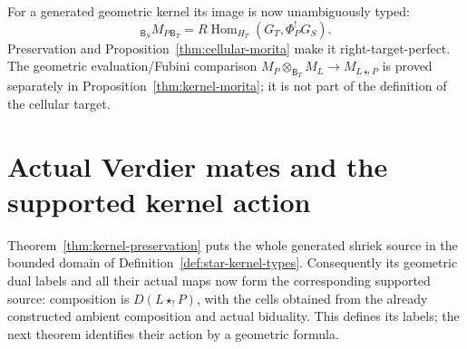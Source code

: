 \documentclass[11pt]{article}
\theoremstyle{definition}
\theoremstyle{remark}
\newcommand{\RHom}{R\operatorname{Hom}}
\begin{document}
For a generated geometric kernel its image is now unambiguously typed:
\[
 {}_{\mathsf B_S}M_P{}_{\mathsf B_T}
 =\RHom_{H_T}(G_T,\Phi_P^!G_S).
\]
Preservation and Proposition~\ref{thm:cellular-morita} make it
right-target-perfect.  The geometric evaluation/Fubini comparison
$M_P\otimes_{\mathsf B_T}M_L\to M_{L\star_!P}$ is proved separately
in Proposition~\ref{thm:kernel-morita}; it is not part of the definition
of the cellular target.

\section{Actual Verdier mates and the supported kernel action}
\label{sec:verdier-mates}
Theorem~\ref{thm:kernel-preservation} puts the whole generated shriek
source in the bounded domain of Definition~\ref{def:star-kernel-types}.
Consequently its geometric dual labels and all their actual maps
now form the corresponding supported source: composition is
$D(L\star_!P)$, with the cells obtained from the already constructed
ambient composition and actual biduality.  This defines its labels;
the next theorem identifies their action by a geometric formula.
\end{document}
